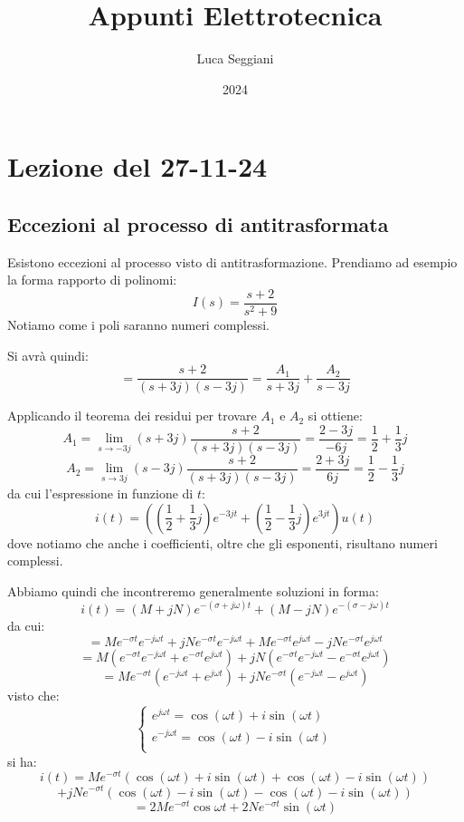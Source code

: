 \documentclass[a4paper,11pt]{article}
\title{Appunti Elettrotecnica}
\author{Luca Seggiani}
\date{2024}
\begin{document}
\section{Lezione del 27-11-24}

\thispagestyle{empty}
\pagestyle{fancy}

\subsection{Eccezioni al processo di antitrasformata}
Esistono eccezioni al processo visto di antitrasformazione.
Prendiamo ad esempio la forma rapporto di polinomi:
$$
I(s) = \frac{s + 2}{s^2 + 9}
$$
Notiamo come i poli saranno numeri complessi.

Si avrà quindi:
$$
= \frac{s + 2}{(s+3j)(s-3j)} = \frac{A_1}{s+3j} + \frac{A_2}{s-3j}
$$

Applicando il teorema dei residui per trovare $A_1$ e $A_2$ si ottiene:
$$
A_1 = \lim_{s\rightarrow -3j} (s + 3j) \frac{s + 2}{(s+3j)(s-3j)} = \frac{2-3j}{-6j} = \frac{1}{2} + \frac{1}{3}j
$$
$$
A_2 = \lim_{s\rightarrow 3j} (s - 3j) \frac{s + 2}{(s+3j)(s-3j)} = \frac{2+3j}{6j} = \frac{1}{2} - \frac{1}{3}j
$$
da cui l'espressione in funzione di $t$:
$$
i(t) = \left( \left( \frac{1}{2} + \frac{1}{3}j \right) e^{-3j t} + \left( \frac{1}{2} - \frac{1}{3}j \right) e^{3jt} \right) u(t)
$$
dove notiamo che anche i coefficienti, oltre che gli esponenti, risultano numeri complessi.

Abbiamo quindi che incontreremo generalmente soluzioni in forma:
$$
i(t) = \left( M + jN \right) e^{-(\sigma + j \omega)t} + \left( M - jN \right) e^{-(\sigma - j \omega)t}
$$
da cui:
$$
= M e^{-\sigma t}e^{-j \omega t} + j N e^{-\sigma t}e^{-j \omega t} + M e^{-\sigma t}e^{j \omega t} - jN e^{-\sigma t}e^{j \omega t}
$$
$$
= M \left( e^{- \sigma t}e^{-j \omega t} + e^{- \sigma t}e^{j \omega t} \right) + j N  \left( e^{-\sigma t}e^{-j \omega t} - e^{-\sigma t}e^{j \omega t} \right)
$$
$$
= M e^{- \sigma t} \left( e^{-j \omega t} + e^{j \omega t} \right) + j N e^{-\sigma t} \left( e^{-j \omega t} - e^{j \omega t} \right)
$$
visto che:
\[
	\begin{cases}
		e^{j \omega t} = \cos(\omega t) + i \sin(\omega t) \\ 	
		e^{-j \omega t} = \cos(\omega t) - i \sin(\omega t) \\ 	
	\end{cases}
\]
si ha:
$$
i(t) = M e^{-\sigma t} ( \cos(\omega t) + i \sin(\omega t) + \cos(\omega t) - i \sin(\omega t) ) 
$$
$$
+ j N e^{-\sigma t} ( \cos(\omega t) - i \sin(\omega t) - \cos(\omega t) - i \sin(\omega t) )
$$
$$
= 2 M e^{-\sigma t} \cos{\omega t} + 2 N e^{-\sigma t} \sin(\omega t)
$$
\end{document}
